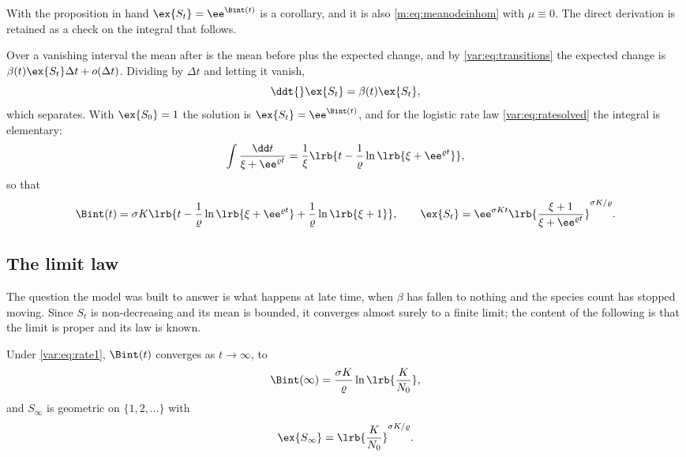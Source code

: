 With the proposition in hand $\ex{S_t}=\ee^{\Bint(t)}$ is a corollary, and it
is also \cref{m:eq:meanodeinhom} with $\mu\equiv0$. The direct derivation is
retained as a check on the integral that follows.

Over a vanishing interval the mean after is the mean before plus the expected
change, and by \cref{var:eq:transitions} the expected change is
$\beta(t)\ex{S_t}\Delta t+o(\Delta t)$. Dividing by $\Delta t$ and letting it
vanish,
\begin{equation}
\ddt{}\ex{S_t}=\beta(t)\ex{S_t},
\label{var:eq:meanode}
\end{equation}
which separates. With $\ex{S_0}=1$ the solution is $\ex{S_t}=\ee^{\Bint(t)}$,
and for the logistic rate law \cref{var:eq:ratesolved} the integral is
elementary:
\begin{equation}
\int\frac{\dd t}{\xi+\ee^{\varrho t}}
=\frac{1}{\xi}\lrb{t-\frac{1}{\varrho}\ln\lrb{\xi+\ee^{\varrho t}}},
\label{var:eq:intbeta}
\end{equation}
so that
\begin{equation}
\Bint(t)=\sigma K\lrb{t-\frac{1}{\varrho}\ln\lrb{\xi+\ee^{\varrho t}}
+\frac{1}{\varrho}\ln\lrb{\xi+1}},
\qquad
\ex{S_t}=\ee^{\sigma Kt}
\lrb{\frac{\xi+1}{\xi+\ee^{\varrho t}}}^{\sigma K/\varrho}.
\label{var:eq:Bt}
\end{equation}

\subsection{The limit law}
\label{var:sec:limit}

The question the model was built to answer is what happens at late time, when
$\beta$ has fallen to nothing and the species count has stopped moving. Since
$S_t$ is non-decreasing and its mean is bounded, it converges almost surely
to a finite limit; the content of the following is that the limit is proper
and its law is known.

\begin{corollary}
\label{var:cor:logistic-limit}
Under \cref{var:eq:rate1}, $\Bint(t)$ converges as $t\to\infty$, to
\begin{equation}
\Bint(\infty)=\frac{\sigma K}{\varrho}\ln\lrb{\frac{K}{N_0}},
\label{var:eq:Binf}
\end{equation}
and $S_\infty$ is geometric on $\{1,2,\dots\}$ with
\begin{equation}
\ex{S_\infty}=\lrb{\frac{K}{N_0}}^{\sigma K/\varrho}.
\label{var:eq:limitmean}
\end{equation}
\end{corollary}

